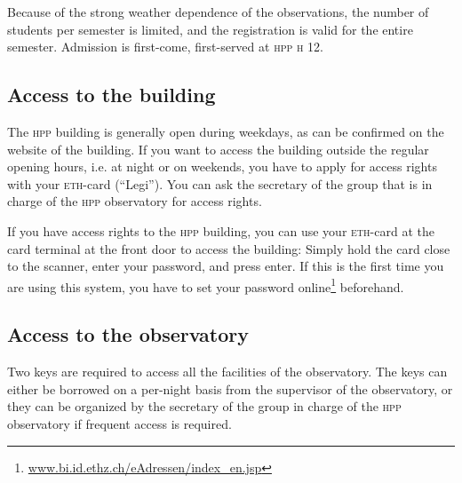 \documentclass[a4paper, 11pt, fleqn]{memoir}
\begin{document}
Because of the strong weather dependence of the observations, the number of students per semester is limited, and the registration is valid for the entire semester.
Admission is first-come, first-served at \textsc{hpp} \textsc{h} 12.

\subsection{Access to the building}
The \textsc{hpp} building is generally open during weekdays, as can be confirmed on the website of the building.
If you want to access the building outside the regular opening hours, i.e. at night or on weekends, you have to apply for access rights with your \textsc{eth}-card (\enquote{Legi}).
You can ask the secretary of the group that is in charge of the \textsc{hpp} observatory for access rights.

If you have access rights to the \textsc{hpp} building, you can use your \textsc{eth}-card at the card terminal at the front door to access the building: Simply hold the card close to the scanner, enter your password, and press enter.
If this is the first time you are using this system, you have to set your password online\footnote{\url{www.bi.id.ethz.ch/eAdressen/index_en.jsp}} beforehand.

\subsection{Access to the observatory}
Two keys are required to access all the facilities of the observatory.
The keys can either be borrowed on a per-night basis from the supervisor of the observatory, or they can be organized by the secretary of the group in charge of the \textsc{hpp} observatory if frequent access is required.

\printbibliography
\end{document}

